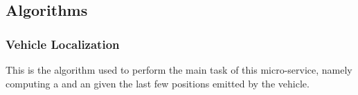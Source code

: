 \documentclass[letterpaper,10pt,english]{sphinxmanual}
\begin{document}
\subsection{Algorithms}
\label{\detokenize{microservices/vehicle_localization/algorithms:algorithms}}\label{\detokenize{microservices/vehicle_localization/algorithms::doc}}

\subsubsection{Vehicle Localization}
\label{\detokenize{microservices/vehicle_localization/algorithms:vehicle-localization}}
This is the algorithm used to perform the main task of this micro-service, namely computing a  and an  given the last few positions emitted by the vehicle.
\end{document}
